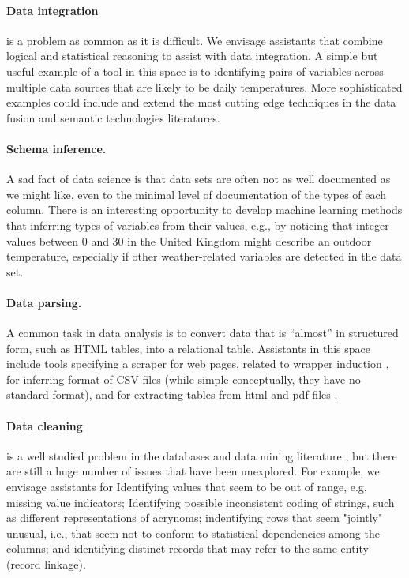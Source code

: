 \documentclass[sigplan,preprint,10pt]{acmart}\settopmatter{printfolios=true,printccs=false,printacmref=false}
\theoremstyle{plain}
\theoremstyle{definition}
\begin{document}
{{\paragraph{Data integration} is a problem as common
as it is difficult. We envisage assistants
that combine logical and statistical reasoning to assist
with data  integration. A simple but useful
example of a tool in this space is to
 identifying pairs of variables across multiple data
sources that are likely to be daily temperatures.
More sophisticated examples could include and extend the
most cutting edge techniques in the data fusion and
semantic technologies literatures.

\paragraph{Schema inference.} A sad fact of data
science is that data sets are often not as well documented
as we might like, even to the minimal level of
documentation of the types of each column.
There is an interesting opportunity to
develop machine learning methods that inferring types of variables from their values, e.g.,
by noticing that integer values between 0 and 30 in
the United Kingdom might describe an outdoor temperature, especially if other weather-related
variables are detected in the data set.

\paragraph{Data parsing.}
A common task in data analysis is to convert
data that is ``almost'' in structured form,
such as HTML tables, into a relational table.
Assistants in this space include
tools specifying a scraper for web pages, related
to wrapper induction \cite{Kushmerick1997WrapperIF},
for inferring format of CSV files (while simple
conceptually, they have no standard format), and
for extracting tables from html and pdf files
\cite{pinto03table}.

\paragraph{Data cleaning} is a well studied
problem in the databases and data mining literature
\cite{abedjan2016detecting,ilyas2015},
but there are still a huge number of issues that have been unexplored.
For example, we envisage assistants for
Identifying values that seem to be out of range, e.g. missing value indicators;
Identifying possible inconsistent coding of strings,
such as different representations of acrynoms;
indentifying rows that seem "jointly" unusual, i.e., that seem not to conform to statistical dependencies among the columns; and
identifying distinct records that may refer to the same entity (record linkage).

}}
\end{document}
